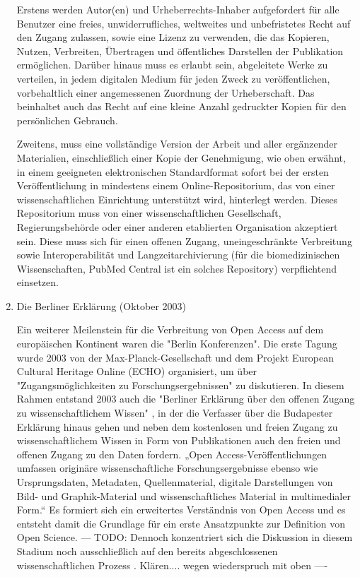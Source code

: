 \begin{enumerate}
Erstens werden Autor(en) und Urheberrechts-Inhaber aufgefordert für alle Benutzer eine freies, unwiderrufliches, weltweites und unbefristetes Recht auf den Zugang zulassen, sowie eine Lizenz zu verwenden, die das Kopieren, Nutzen, Verbreiten, Übertragen und öffentliches Darstellen der Publikation ermöglichen. Darüber hinaus muss es erlaubt sein, abgeleitete Werke zu verteilen, in jedem digitalen Medium für jeden Zweck zu veröffentlichen, vorbehaltlich einer angemessenen Zuordnung der Urheberschaft. Das beinhaltet auch das Recht auf eine kleine Anzahl gedruckter Kopien für den persönlichen Gebrauch. 

Zweitens, muss eine vollständige Version der Arbeit und aller ergänzender Materialien, einschließlich einer Kopie der Genehmigung, wie oben erwähnt, in einem geeigneten elektronischen Standardformat sofort bei der ersten Veröffentlichung in mindestens einem Online-Repositorium, das von einer wissenschaftlichen Einrichtung unterstützt wird, hinterlegt werden. Dieses Repositorium muss von einer wissenschaftlichen Gesellschaft, Regierungsbehörde oder einer anderen etablierten Organisation akzeptiert sein. Diese muss sich für einen offenen Zugang, uneingeschränkte Verbreitung sowie Interoperabilität und Langzeitarchivierung (für die biomedizinischen Wissenschaften, PubMed Central ist ein solches Repository) verpflichtend einsetzen.

\item Die Berliner Erklärung (Oktober 2003)

Ein weiterer Meilenstein für die Verbreitung von Open Access auf dem europäischen Kontinent waren die "Berlin Konferenzen"\cite{CREATe_2014}. Die erste Tagung wurde 2003 von der Max-Planck-Gesellschaft und dem Projekt European Cultural Heritage Online (ECHO) organisiert, um über "Zugangsmöglichkeiten zu Forschungsergebnissen" zu diskutieren. In diesem Rahmen entstand 2003 auch die "Berliner Erklärung über den offenen Zugang zu wissenschaftlichem Wissen" \cite{berliner_erklaerung_2003}, in der die Verfasser über die Budapester Erklärung hinaus gehen und neben dem kostenlosen und freien Zugang zu wissenschaftlichem Wissen in Form von Publikationen auch den freien und offenen Zugang zu den Daten fordern. „Open Access-Veröffentlichungen umfassen originäre wissenschaftliche Forschungsergebnisse ebenso wie Ursprungsdaten, Metadaten, Quellenmaterial, digitale Darstellungen von Bild- und Graphik-Material und wissenschaftliches Material in multimedialer Form.“ \cite{berliner_erklaerung_2003} Es formiert sich ein erweitertes Verständnis von Open Access und es entsteht damit die Grundlage für ein erste Ansatzpunkte zur Definition von Open Science. --- TODO: Dennoch konzentriert sich die Diskussion in diesem Stadium noch ausschließlich auf den bereits abgeschlossenen wissenschaftlichen Prozess \cite{suchen}.  Klären.... wegen wiederspruch mit oben ----

\end{enumerate}

